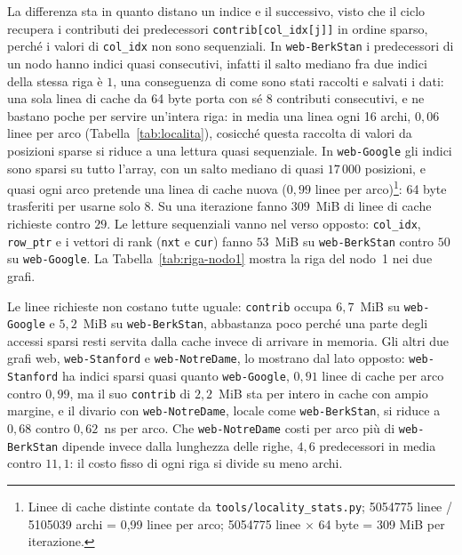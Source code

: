 \documentclass[11pt,a4paper]{article}
\newcommand{\stacco}{\par\medskip\noindent}
\begin{document}
\stacco
La differenza sta in quanto distano un indice e il successivo,
visto che il ciclo recupera i contributi dei predecessori \texttt{contrib[col\_idx[j]]} 
in ordine sparso, perché i valori di \texttt{col\_idx} non sono sequenziali.
In \texttt{web-BerkStan} i predecessori di un
nodo hanno indici quasi consecutivi, infatti il salto mediano fra due indici della
stessa riga è $1$, una conseguenza di come sono stati raccolti e salvati i dati:
una sola linea di cache da 64 byte porta con sé 8 contributi consecutivi,
e ne bastano poche per servire un'intera riga: in media una linea ogni 16
archi, $0{,}06$ linee per arco (Tabella~\ref{tab:localita}),
cosicché questa raccolta di valori da posizioni sparse si riduce a una 
lettura quasi sequenziale. In \texttt{web-Google} gli indici sono sparsi su
tutto l'array, con un salto mediano di quasi $17\,000$ posizioni, e
quasi ogni arco pretende una linea di cache nuova ($0{,}99$ linee per
arco)\footnote{Linee di cache distinte contate da \texttt{tools/locality\_stats.py};
5054775 linee / 5105039 archi = 0,99 linee per arco; 5054775 linee
$\times$ 64 byte = 309 MiB per iterazione.}: 64 byte trasferiti per usarne solo 8.
Su una iterazione fanno $309$~MiB di linee di cache richieste contro $29$.
Le letture sequenziali vanno nel verso opposto: \texttt{col\_idx},
\texttt{row\_ptr} e i vettori di rank (\texttt{nxt} e \texttt{cur}) fanno
$53$~MiB su \texttt{web-BerkStan} contro $50$ su \texttt{web-Google}.
La Tabella~\ref{tab:riga-nodo1} mostra la riga del nodo~1 nei due grafi.

\stacco
Le linee richieste non costano tutte uguale: \texttt{contrib} occupa
$6{,}7$~MiB su \texttt{web-Google} e $5{,}2$~MiB su \texttt{web-BerkStan},
abbastanza poco perché una parte degli accessi sparsi resti servita dalla
cache invece di arrivare in memoria. Gli altri due grafi web,
\texttt{web-Stanford} e \texttt{web-NotreDame}, lo mostrano dal lato opposto:
\texttt{web-Stanford} ha indici sparsi quasi quanto
\texttt{web-Google}, $0{,}91$ linee di cache per arco contro $0{,}99$, ma il
suo \texttt{contrib} di $2{,}2$~MiB sta per intero in cache con ampio margine, e il divario con
\texttt{web-NotreDame}, locale come \texttt{web-BerkStan}, si riduce a
$0{,}68$ contro $0{,}62$~ns per arco. Che \texttt{web-NotreDame} costi per
arco più di \texttt{web-BerkStan} dipende invece dalla lunghezza delle righe,
$4{,}6$ predecessori in media contro $11{,}1$: il costo fisso di ogni riga si
divide su meno archi.
\end{document}
